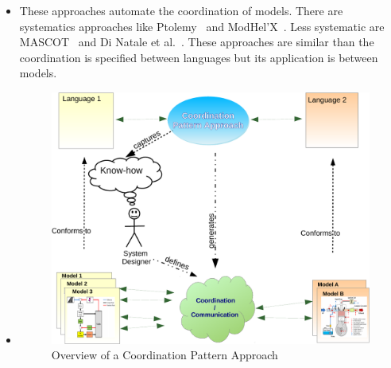          \begin{itemize}
         	\item These approaches automate the coordination of models. There are systematics approaches like Ptolemy~\cite{ptoleframebib} and ModHel'X~\cite{modhelxbib}. Less systematic are MASCOT~\cite{mascotbib} and Di Natale et al.~\cite{dinatale}. These approaches are similar than the coordination is specified between languages but its application is between models.  
         	
         	\item {}
         	
         	\begin{figure}
         		\begin{center}
         			\includegraphics[width=0.6\columnwidth]{framework/figs/coordpatterapp}
         			\caption{Overview of a Coordination Pattern Approach}
         			\label{fig:coordpatterapp}
         		\end{center}
         	\end{figure}
         	

\end{itemize}
